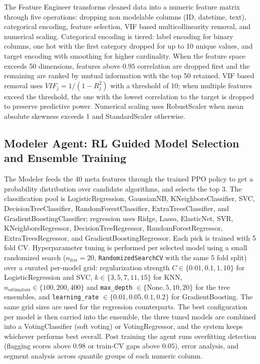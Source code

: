 \documentclass{article}
\begin{document}
The Feature Engineer transforms cleaned data into a numeric feature matrix
through five operations: dropping non modelable columns (ID, datetime,
text), categorical encoding, feature selection, VIF based multicollinearity
removal, and numerical scaling. Categorical encoding is tiered: label
encoding for binary columns, one hot with the first category dropped for up
to 10 unique values, and target encoding with smoothing for higher
cardinality. When the feature space exceeds 50 dimensions, features above
$0.95$ correlation are dropped first and the remaining are ranked by mutual
information with the top 50 retained. VIF based removal uses
$VIF_j = 1/(1-R^2_j)$ with a threshold of 10; when multiple features exceed
the threshold, the one with the lowest correlation to the target is dropped
to preserve predictive power. Numerical scaling uses RobustScaler when mean
absolute skewness exceeds 1 and StandardScaler otherwise.

\subsection{Modeler Agent: RL Guided Model Selection and Ensemble Training}

The Modeler feeds the 40 meta features through the trained PPO policy to
get a probability distribution over candidate algorithms, and selects the
top 3. The classification pool is LogisticRegression, GaussianNB,
KNeighborsClassifier, SVC, DecisionTreeClassifier, RandomForestClassifier,
ExtraTreesClassifier, and GradientBoostingClassifier; regression uses
Ridge, Lasso, ElasticNet, SVR, KNeighborsRegressor, DecisionTreeRegressor,
RandomForestRegressor, ExtraTreesRegressor, and GradientBoostingRegressor.
Each pick is trained with 5 fold CV. Hyperparameter tuning is performed per
selected model using a small randomized search ($n_{\text{iter}}=20$,
\texttt{RandomizedSearchCV} with the same 5 fold split) over a curated
per-model grid: regularization strength $C \in \{0.01, 0.1, 1, 10\}$ for
LogisticRegression and SVC, $k \in \{3, 5, 7, 11, 15\}$ for KNN, $n_{\text{estimators}}
\in \{100, 200, 400\}$ and \texttt{max\_depth} $\in \{$None$, 5, 10, 20\}$
for the tree ensembles, and \texttt{learning\_rate} $\in \{0.01, 0.05, 0.1, 0.2\}$
for GradientBoosting. The same grid sizes are used for the regression
counterparts. The best configuration per model is then carried into the
ensemble, the three tuned models are combined into a VotingClassifier (soft
voting) or VotingRegressor, and the system keeps whichever performs best
overall. Post training the agent runs overfitting
detection (flagging scores above $0.98$ or train-CV gaps above $0.05$),
error analysis, and segment analysis across quantile groups of each numeric
column.
\end{document}

